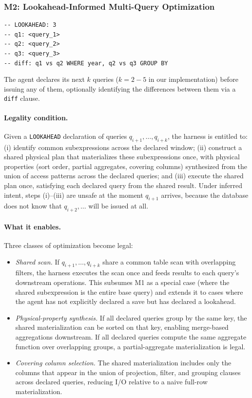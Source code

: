 \subsubsection{M2: Lookahead-Informed Multi-Query Optimization}
\label{sec:protocol:m2}

\begin{verbatim}
-- LOOKAHEAD: 3
-- q1: <query_1>
-- q2: <query_2>
-- q3: <query_3>
-- diff: q1 vs q2 WHERE year, q2 vs q3 GROUP BY
\end{verbatim}
The agent declares its next $k$ queries ($k = 2{-}5$ in our implementation) before issuing any of them, optionally identifying the differences between them via a \texttt{diff} clause.

\paragraph{Legality condition.}
Given a \texttt{LOOKAHEAD} declaration of queries $q_{i+1}, \ldots, q_{i+k}$, the harness is entitled to: (i) identify common subexpressions across the declared window; (ii) construct a shared physical plan that materializes these subexpressions once, with physical properties (sort order, partial aggregates, covering columns) synthesized from the union of access patterns across the declared queries; and (iii) execute the shared plan once, satisfying each declared query from the shared result. Under inferred intent, steps (i)--(iii) are unsafe at the moment $q_{i+1}$ arrives, because the database does not know that $q_{i+2}, \ldots$ will be issued at all.

\paragraph{What it enables.}
Three classes of optimization become legal:

\begin{itemize}
\item \emph{Shared scan.} If $q_{i+1}, \ldots, q_{i+k}$ share a common table scan with overlapping filters, the harness executes the scan once and feeds results to each query's downstream operations. This subsumes M1 as a special case (where the shared subexpression is the entire base query) and extends it to cases where the agent has not explicitly declared a save but has declared a lookahead.
\item \emph{Physical-property synthesis.} If all declared queries group by the same key, the shared materialization can be sorted on that key, enabling merge-based aggregations downstream. If all declared queries compute the same aggregate function over overlapping groups, a partial-aggregate materialization is legal.
\item \emph{Covering column selection.} The shared materialization includes only the columns that appear in the union of projection, filter, and grouping clauses across declared queries, reducing I/O relative to a naive full-row materialization.
\end{itemize}

